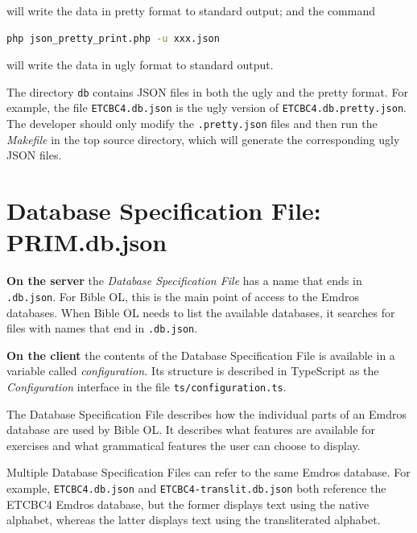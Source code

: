 \documentclass[11pt,oneside,a4paper]{memoir}
\begin{document}
\noindent
will write the data in pretty format to standard output; and the command

\begin{lstlisting}[language=bash]
php json_pretty_print.php -u xxx.json
\end{lstlisting}

\noindent
will write the data in ugly format to standard output.

The directory \texttt{db} contains JSON files in both the ugly and the pretty format. For example,
the file \texttt{ETCBC4.db.json} is the ugly version of \texttt{ETCBC4.db.pretty.json}. The
developer should only modify the \texttt{.pretty.json} files and then run the
\emph{Makefile} in the top source directory, which will generate the corresponding ugly JSON files.




\section{Database Specification File: PRIM.db.json}\label{sec-dsf}

\textbf{On the server} the \emph{Database Specification File} has a name that ends in \texttt{.db.json}. For Bible OL,
this is the main point of access to the Emdros databases. When Bible OL needs to list the available
databases, it searches for files with names that end in \texttt{.db.json}.

\textbf{On the client} the contents of the Database Specification File is available in a variable
called \emph{configuration.}%
Its structure is described in TypeScript as the \emph{Configuration}%
interface in the file \texttt{ts/configuration.ts}.

The Database Specification File describes how the individual parts of an Emdros database are used by Bible
OL. It describes what features are available for exercises and what grammatical features the user
can choose to display.

Multiple Database Specification Files can refer to the same Emdros database. For example,
\texttt{ETCBC4.db.json} and \texttt{ETCBC4-translit.db.json} both reference the ETCBC4 Emdros
database, but the former displays text using the native alphabet, whereas the
latter displays text using the transliterated alphabet.
\end{document}
